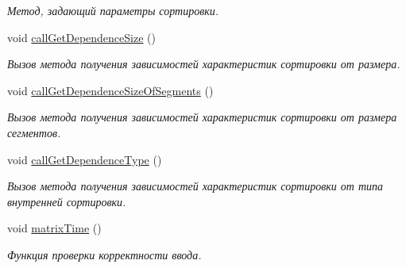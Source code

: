 \begin{DoxyCompactItemize}
\begin{DoxyCompactList}\small\item\em Метод, задающий параметры сортировки. \end{DoxyCompactList}\item 
void \hyperlink{class_user_interface_a1dc307f92c919866f13ddaf30cde1a70}{call\+Get\+Dependence\+Size} ()
\begin{DoxyCompactList}\small\item\em Вызов метода получения зависимостей характеристик сортировки от размера. \end{DoxyCompactList}\item 
void \hyperlink{class_user_interface_ab668f3b2d9f89ce3eacda5e166f33807}{call\+Get\+Dependence\+Size\+Of\+Segments} ()
\begin{DoxyCompactList}\small\item\em Вызов метода получения зависимостей характеристик сортировки от размера сегментов. \end{DoxyCompactList}\item 
void \hyperlink{class_user_interface_aa413c00a65ae4faf9421e9fc359663ec}{call\+Get\+Dependence\+Type} ()
\begin{DoxyCompactList}\small\item\em Вызов метода получения зависимостей характеристик сортировки от типа внутренней сортировки. \end{DoxyCompactList}\item 
void \hyperlink{class_user_interface_af9043ca8df15d62de342d7cbfa2eb3d7}{matrix\+Time} ()
\begin{DoxyCompactList}\small\item\em Функция проверки корректности ввода. \end{DoxyCompactList}\end{DoxyCompactItemize}
